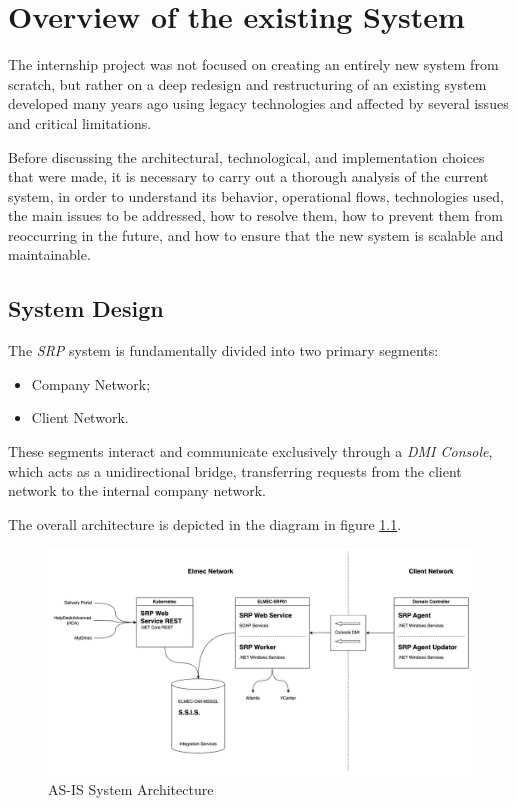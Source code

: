 \chapter{Overview of the existing System}
The internship project was not focused on creating an entirely new system from scratch, but rather on a deep redesign and restructuring of an existing system developed many years ago using legacy technologies and affected by several issues and critical limitations.

Before discussing the architectural, technological, and implementation choices that were made, it is necessary to carry out a thorough analysis of the current system, in order to understand its behavior, operational flows, technologies used, the main issues to be addressed, how to resolve them, how to prevent them from reoccurring in the future, and how to ensure that the new system is scalable and maintainable.

\section{System Design}

The \textit{SRP} system is fundamentally divided into two primary segments: 
\begin{itemize}
    \item Company Network;
    \item Client Network.
\end{itemize}

These segments interact and communicate exclusively through a \textit{DMI Console}, which acts as a unidirectional bridge, transferring requests from the client network to the internal company network. 

The overall architecture is depicted in the diagram in figure \ref{fig:as-is-system-design}.

\begin{figure}[h]
  \centering
  \includegraphics[width=1.0\textwidth]{images/as-is/SRP AS-IS (System Architecture).jpg}
  \caption{AS-IS System Architecture}
  \label{fig:as-is-system-design}
\end{figure}

